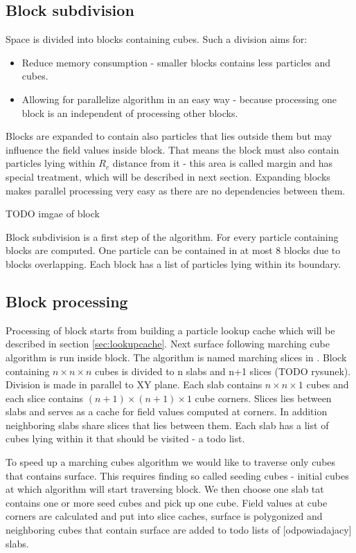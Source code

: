 \subsection{Block subdivision} \label{sec:block_subdivision}
Space is divided into blocks containing cubes. Such a division aims for:
\begin{itemize}
\item Reduce memory consumption - smaller blocks contains less particles and cubes. 
\item Allowing for parallelize algorithm in an easy way - because processing one block is an independent of processing other blocks. 
\end{itemize}
Blocks are expanded to contain also particles that lies outside them but may influence the field values inside block. That means the block must also contain particles lying within $R_c$ distance from it - this area is called margin and has special treatment, which will be described in next section. Expanding blocks makes parallel processing very easy as there are no dependencies between them.

TODO imgae of block

Block subdivision is a first step of the algorithm. For every particle containing blocks are computed. One particle can be contained in at most 8 blocks due to blocks overlapping. Each block has a list of particles lying within its boundary. 

\subsection{Block processing} \label{sec:block_processing}
Processing of block starts from building a particle lookup cache which will be described in section \ref{sec:lookupcache}. Next surface following marching cube algorithm is run inside block. The algorithm is named marching slices in \cite{RosenbergBirdwell2008}. Block containing $n \times n \times n$ cubes is divided to n slabs and n+1 slices (TODO rysunek). Division is made in parallel to XY plane. Each slab contains $n \times n \times 1$ cubes and each slice contains $(n+1) \times (n+1) \times 1$ cube corners. Slices lies between slabs and serves as a cache for field values computed at corners. In addition neighboring slabs share slices that lies between them. Each slab has a list of cubes lying within it that should be visited - a todo list.

To speed up a marching cubes algorithm we would like to traverse only cubes that contains surface. This requires finding so called seeding cubes - initial cubes at which algorithm will start traversing block. We then choose one slab tat contains one or more seed cubes and pick up one cube. Field values at cube corners are calculated and put into slice caches, surface is polygonized and neighboring cubes that contain surface are added to todo lists of [odpowiadajacy] slabs. 

